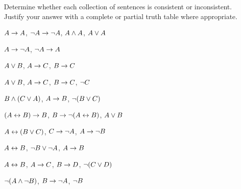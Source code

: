 \noindent\problempart
\label{pr.TT.consistent}
Determine whether each collection of sentences is consistent or inconsistent. Justify your answer with a complete or partial truth table where appropriate.
\begin{earg}
\item $A\rightarrow A$, $\neg A \rightarrow \neg A$, $A\wedge A$, $A\vee A$ \vspace{.5ex}%
\item $A \rightarrow \neg A$, $\neg A \rightarrow A$\vspace{.5ex}%
\item $A\vee B$, $A\rightarrow C$, $B\rightarrow C$\vspace{.5ex} %
\item $A \vee B$, $A \rightarrow C$, $B \rightarrow C$, $\neg C$\vspace{.5ex} %
\item $B\wedge(C\vee A)$, $A\rightarrow B$, $\neg(B\vee C)$\vspace{.5ex}  %
\item $(A \leftrightarrow B) \rightarrow B$,  $B \rightarrow \neg (A \leftrightarrow B)$, $A \vee B$ \vspace{.5ex} %
\item $A\leftrightarrow(B\vee C)$, $C\rightarrow \neg A$, $A\rightarrow \neg B$\vspace{.5ex} %
\item  $A \leftrightarrow B$,  $\neg B \vee \neg A$,  $A \rightarrow  B$ \vspace{.5ex}%
\item $A \leftrightarrow B$, $A \rightarrow C$, $B \rightarrow D$, $\neg(C \vee D)$\vspace{.5ex} %
\item $\neg (A \wedge \neg B)$,  $B \rightarrow \neg A$, $\neg B$  \vspace{.5ex} %

\end{earg}


